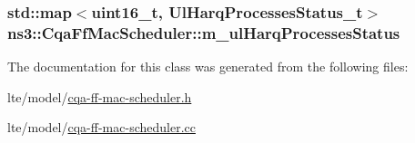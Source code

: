 \subsubsection[{\texorpdfstring{m\+\_\+ul\+Harq\+Processes\+Status}{m_ulHarqProcessesStatus}}]{\setlength{\rightskip}{0pt plus 5cm}std\+::map$<$uint16\+\_\+t, {\bf Ul\+Harq\+Processes\+Status\+\_\+t}$>$ ns3\+::\+Cqa\+Ff\+Mac\+Scheduler\+::m\+\_\+ul\+Harq\+Processes\+Status\hspace{0.3cm}{\ttfamily [private]}}\hypertarget{classns3_1_1CqaFfMacScheduler_a6dd8ea014c55132578f7c050e726f856}{}\label{classns3_1_1CqaFfMacScheduler_a6dd8ea014c55132578f7c050e726f856}


The documentation for this class was generated from the following files\+:\begin{DoxyCompactItemize}
\item 
lte/model/\hyperlink{cqa-ff-mac-scheduler_8h}{cqa-\/ff-\/mac-\/scheduler.\+h}\item 
lte/model/\hyperlink{cqa-ff-mac-scheduler_8cc}{cqa-\/ff-\/mac-\/scheduler.\+cc}\end{DoxyCompactItemize}
